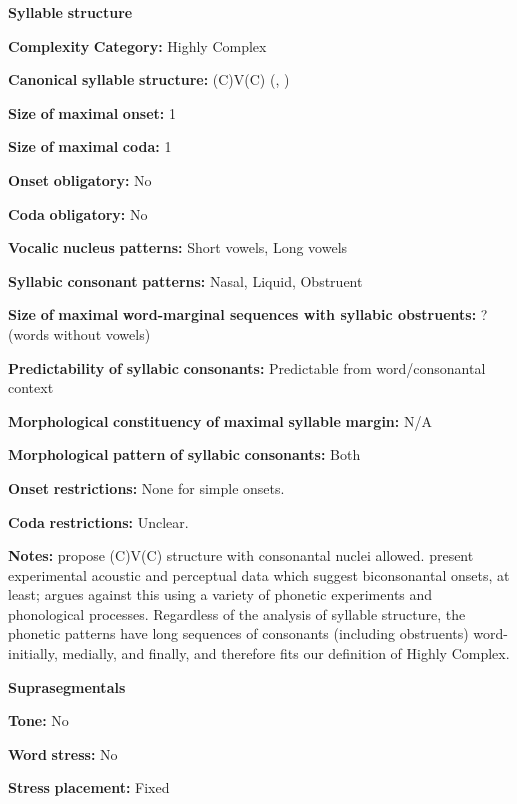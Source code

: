 \begin{styleBody}
\textbf{Syllable} \textbf{structure}

\textbf{Complexity} \textbf{Category:} Highly Complex

\textbf{Canonical} \textbf{syllable} \textbf{structure:} (C)V(C) (\citealt{DellElmedlaoui2002}, \citealt{Ridouane2008})

\textbf{Size} \textbf{of} \textbf{maximal} \textbf{onset:} 1

\textbf{Size} \textbf{of} \textbf{maximal} \textbf{coda:} 1

\textbf{Onset} \textbf{obligatory:} No

\textbf{Coda} \textbf{obligatory:} No

\textbf{Vocalic} \textbf{nucleus} \textbf{patterns:} Short vowels, Long vowels

\textbf{Syllabic} \textbf{consonant} \textbf{patterns:} Nasal, Liquid, Obstruent

\textbf{Size} \textbf{of} \textbf{maximal} \textbf{word{}-marginal sequences with syllabic obstruents:} ? (words without vowels)

\textbf{Predictability} \textbf{of} \textbf{syllabic} \textbf{consonants:} Predictable from word/consonantal context

\textbf{Morphological} \textbf{constituency} \textbf{of} \textbf{maximal} \textbf{syllable} \textbf{margin:} N/A

\textbf{Morphological} \textbf{pattern} \textbf{of} \textbf{syllabic} \textbf{consonants:} Both

\textbf{Onset} \textbf{restrictions:} None for simple onsets.

\textbf{Coda} \textbf{restrictions:} Unclear.

\textbf{Notes:} \citet{DellElmedlaoui2002} propose (C)V(C) structure with consonantal nuclei allowed. \citet{PuechLouali1999} present experimental acoustic and perceptual data which suggest biconsonantal onsets, at least; \citet{Ridouane2008} argues against this using a variety of phonetic experiments and phonological processes. Regardless of the analysis of syllable structure, the phonetic patterns have long sequences of consonants (including obstruents) word-initially, medially, and finally, and therefore fits our definition of Highly Complex.

\textbf{Suprasegmentals}

\textbf{Tone:} No

\textbf{Word} \textbf{stress:} No

\textbf{Stress} \textbf{placement:} Fixed


\end{styleBody}
